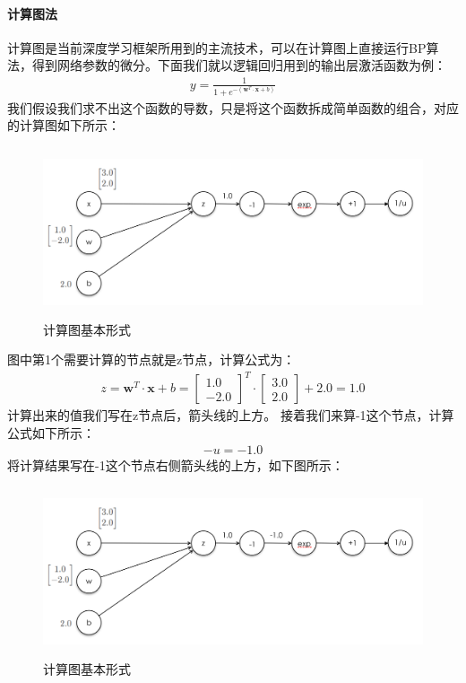 \documentclass[UTF8]{article}
\begin{document}
\paragraph{计算图法}
计算图是当前深度学习框架所用到的主流技术，可以在计算图上直接运行BP算法，得到网络参数的微分。下面我们就以逻辑回归用到的输出层激活函数为例：
\begin{equation}
\begin{aligned}
y=\frac{1}{1+e^{-(\boldsymbol{w}^T \cdot \boldsymbol{x}+b)}}
\end{aligned}
\label{mlp-sigmoid-def2}
\end{equation}
我们假设我们求不出这个函数的导数，只是将这个函数拆成简单函数的组合，对应的计算图如下所示：
\begin{figure}[H]
	\caption{计算图基本形式}
	\label{f000037}
	\centering
	\includegraphics[height=5cm]{images/f000037}
\end{figure}
图中第1个需要计算的节点就是z节点，计算公式为：
\begin{equation}
\begin{aligned}
z=\boldsymbol{w}^T \cdot \boldsymbol{x}+b=\begin{bmatrix}
1.0 \\
-2.0
\end{bmatrix}^T \cdot \begin{bmatrix}
3.0 \\
2.0
\end{bmatrix}+2.0=1.0
\end{aligned}
\label{mlp-sigmoid-cg-1}
\end{equation}
计算出来的值我们写在z节点后，箭头线的上方。\newline
接着我们来算-1这个节点，计算公式如下所示：
\begin{equation}
\begin{aligned}
-u=-1.0
\end{aligned}
\label{mlp-sigmoid-cg-2}
\end{equation}
将计算结果写在-1这个节点右侧箭头线的上方，如下图所示：
\begin{figure}[H]
	\caption{计算图基本形式}
	\label{f000038}
	\centering
	\includegraphics[height=5cm]{images/f000038}
\end{figure}
\end{document}
